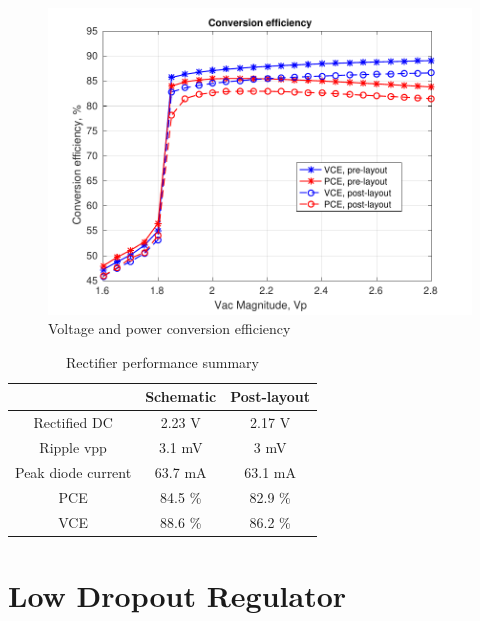 \documentclass[12pt,a4paper,UKenglish]{report}
\begin{document}
\begin{figure}[!htbp] %
   \centering
   \includegraphics[width=\textwidth]{img/rectifier_ce.pdf} 
   \caption{Voltage and power conversion efficiency}
   \label{rect_ce}
\end{figure}


\begin{table}[H]
\caption{Rectifier performance summary}
\begin{center}
\begin{tabular}{c|c|c}
\hline \hline
				 & \textbf{Schematic}		& \textbf{Post-layout} \\
\hline \hline
Rectified DC	 	& 2.23 V 				& 2.17 V	\\ \hline
Ripple \acrshort{vpp} & 3.1 mV 				& 3 mV	\\ \hline
Peak diode current 	& 63.7 mA 			&	63.1 mA	\\ \hline
PCE 				& 84.5 \% 				&	82.9 \%	\\ \hline
VCE 				& 88.6 \% 				&	86.2 \%	\\
\hline \hline
\end{tabular}
\end{center}
\label{tab:rect_spec}
\end{table}


\chapter{Low Dropout Regulator}
\end{document}
